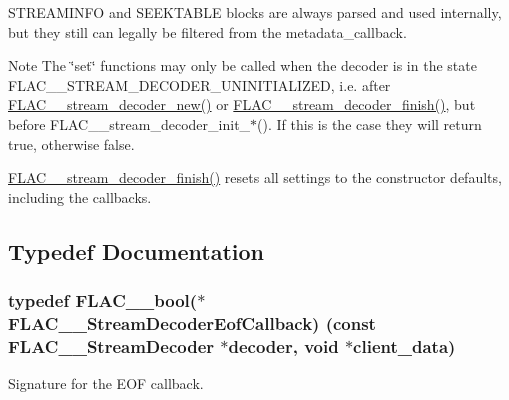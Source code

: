 S\+T\+R\+E\+A\+M\+I\+N\+FO and S\+E\+E\+K\+T\+A\+B\+LE blocks are always parsed and used internally, but they still can legally be filtered from the metadata\+\_\+callback.

\begin{DoxyNote}{Note}
The \char`\"{}set\char`\"{} functions may only be called when the decoder is in the state F\+L\+A\+C\+\_\+\+\_\+\+S\+T\+R\+E\+A\+M\+\_\+\+D\+E\+C\+O\+D\+E\+R\+\_\+\+U\+N\+I\+N\+I\+T\+I\+A\+L\+I\+Z\+ED, i.\+e. after \hyperlink{group__flac__stream__decoder_ga7159eefc074dfbab4a37462f69326091}{F\+L\+A\+C\+\_\+\+\_\+stream\+\_\+decoder\+\_\+new()} or \hyperlink{group__flac__stream__decoder_gaa51bb38f762ee11b320a0839f165c5ce}{F\+L\+A\+C\+\_\+\+\_\+stream\+\_\+decoder\+\_\+finish()}, but before F\+L\+A\+C\+\_\+\+\_\+stream\+\_\+decoder\+\_\+init\+\_\+$\ast$(). If this is the case they will return {\ttfamily true}, otherwise {\ttfamily false}.

\hyperlink{group__flac__stream__decoder_gaa51bb38f762ee11b320a0839f165c5ce}{F\+L\+A\+C\+\_\+\+\_\+stream\+\_\+decoder\+\_\+finish()} resets all settings to the constructor defaults, including the callbacks. 
\end{DoxyNote}


\subsection{Typedef Documentation}
\subsubsection[{\texorpdfstring{F\+L\+A\+C\+\_\+\+\_\+\+Stream\+Decoder\+Eof\+Callback}{FLAC__StreamDecoderEofCallback}}]{\setlength{\rightskip}{0pt plus 5cm}typedef {\bf F\+L\+A\+C\+\_\+\+\_\+bool}($\ast$ F\+L\+A\+C\+\_\+\+\_\+\+Stream\+Decoder\+Eof\+Callback) ({\bf const} {\bf F\+L\+A\+C\+\_\+\+\_\+\+Stream\+Decoder} $\ast$decoder, {\bf void} $\ast$client\+\_\+data)}\hypertarget{group__flac__stream__decoder_ga4eac094fc609363532d90cf8374b4f7e}{}\label{group__flac__stream__decoder_ga4eac094fc609363532d90cf8374b4f7e}
Signature for the E\+OF callback.

